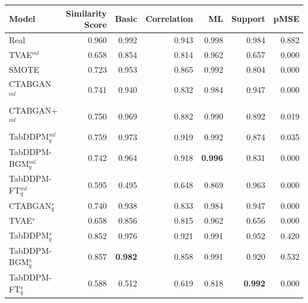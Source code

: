 \begin{table}[h]
	\centering
	\begin{tabular}{lrrrrrr}
		\toprule
		\textbf{Model}       & \textbf{Similarity Score} & \textbf{Basic} & \textbf{Correlation} & \textbf{ML}    & \textbf{Support} & \textbf{pMSE}  \\
		\midrule
		Real                 & 0.960                     & 0.992          & 0.943                & 0.998          & 0.984            & 0.882          \\
		TVAE$^{ml}$          & 0.658                     & 0.854          & 0.814                & 0.962          & 0.657            & 0.000          \\
		SMOTE                & 0.723                     & 0.953          & 0.865                & 0.992          & 0.804            & 0.000          \\
		CTABGAN$^{ml}$       & 0.741                     & 0.940          & 0.832                & 0.984          & 0.947            & 0.000          \\
		CTABGAN+$^{ml}$      & 0.750                     & 0.969          & 0.882                & 0.990          & 0.892            & 0.019          \\
		TabDDPM$^{ml}_q$     & 0.759                     & 0.973          & 0.919                & 0.992          & 0.874            & 0.035          \\
		TabDDPM-BGM$^{ml}_q$ & 0.742                     & 0.964          & 0.918                & \textbf{0.996} & 0.831            & 0.000          \\
		TabDDPM-FT$^{ml}_q$  & 0.595                     & 0.495          & 0.648                & 0.869          & 0.963            & 0.000          \\
		CTABGAN$^{s}_q$      & 0.740                     & 0.938          & 0.833                & 0.984          & 0.947            & 0.000          \\
		TVAE$^{s}$           & 0.658                     & 0.856          & 0.815                & 0.962          & 0.656            & 0.000          \\
		TabDDPM$^{s}_q$      & 0.852                     & 0.976          & 0.921                & 0.991          & 0.952            & 0.420          \\
		TabDDPM-BGM$^{s}_q$  & 0.857                     & \textbf{0.982} & 0.858                & 0.991          & 0.920            & 0.532          \\
		TabDDPM-FT$^{s}_q$   & 0.588                     & 0.512          & 0.619                & 0.818          & \textbf{0.992}   & 0.000          \\

\end{tabular}
\end{table}
